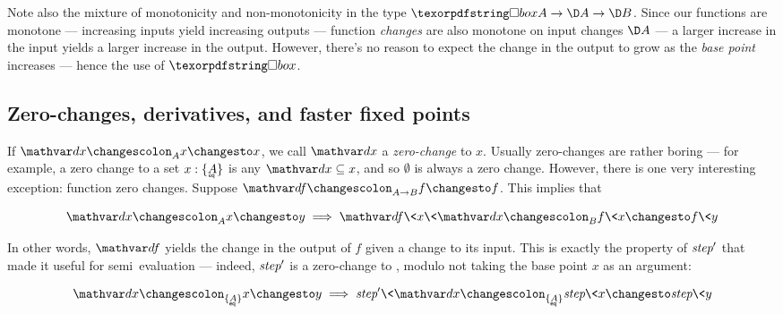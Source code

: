 

Note also the mixture of monotonicity and non-monotonicity in the type $\iso A
\to \D A \to \D B$. Since our functions are monotone --- increasing inputs yield
increasing outputs --- function \emph{changes} are also monotone on input
changes $\D A$ --- a larger increase in the input yields a larger increase in
the output. However, there's no reason to expect the change in the output to
grow as the \emph{base point} increases --- hence the use of $\iso$.


\subsection{Zero-changes, derivatives, and faster fixed points}
\label{sec:derivatives}

If $\changesat A \dx x x$, we call $\dx$ a \emph{zero-change} to $x$. Usually
zero-changes are rather boring --- for example, a zero change to a set $x :
\tseteq{A}$ is any $\dx \subseteq x$, and so $\emptyset$ is always a zero
change.
%
However, there is one very interesting exception: function zero changes. Suppose
$\changesat{A \to B}{\df}{f}{f}$. This implies that

\begin{equation}\label{eqn:derivative}
  \changesat A \dx x y \implies \changesat B{\df\<x\<\dx}{f\<x}{f\<y}
\end{equation}

\noindent
In other words, $\df$ yields the change in the output of $f$ given a change to
its input.
%
This is exactly the property of $\text{\itshape step}'$ that made it useful for
semi\naive\ evaluation --- indeed, $\text{\itshape step}'$ is a zero-change to
, modulo not taking the base point $x$ as an argument:

\[ \changesat{\tseteq A} \dx x y \implies
\changesat{\tseteq A}{\name{step}'\<\dx}{\name{step}\<x}{\name{step}\<y}
\]


